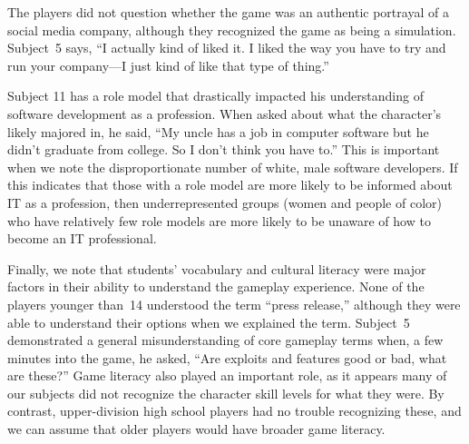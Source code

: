 \documentclass[letterpaper]{article}
\begin{document}
The players did not question whether the game was an authentic
portrayal of a social media company, although they recognized
the game as being a simulation.
Subject~5 says, ``I actually kind of liked it. I liked the way you have to try and run your company---I just kind of like that type of thing.''

Subject 11 has a role model that drastically impacted his understanding of software development as a profession. When asked about what the character’s likely majored in, he said, “My uncle has a job in computer software but he didn’t graduate from college. So I don’t think you have to.” This is important when we note the disproportionate number of white, male software developers. If this indicates that those with a role model are more likely to be informed about IT as a profession, then underrepresented groups (women and people of color) who have relatively few role models are more likely to be unaware of how to become an IT professional.

Finally, we note that students' vocabulary and cultural literacy
were major factors in their ability to understand the gameplay
experience.
None of the players younger than~14 understood the term ``press release,''
although they were able to understand their options when we explained
the term.
Subject~5 demonstrated a general misunderstanding of core
gameplay terms when, a few minutes into the game, he asked,
``Are exploits and features good or bad, what are these?''
Game literacy also played an important role, as it appears many of
our subjects did not recognize the character skill levels for what they were.
By contrast, upper-division high school players had no trouble recognizing
these, and we can assume that older players would have broader game literacy.


\end{document}
